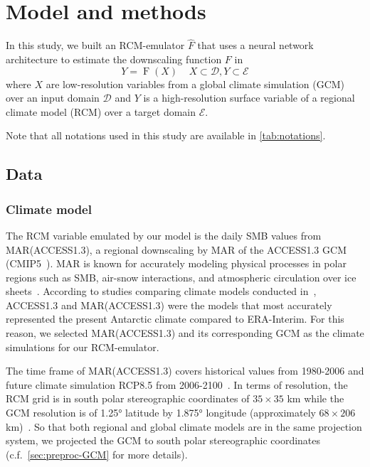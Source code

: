 \documentclass[a4paper,11pt,oneside]{report}
\begin{document}




\chapter{Model and methods}

In this study, we built an RCM-emulator $\hat{F}$ that uses a neural network architecture to estimate the downscaling function $F$ in 
\begin{equation}\label{eq:emulator-equation}
    Y = \operatorname{F}(X) \;\;\;\; X\subset\mathcal{D}, Y\subset\mathcal{E}
    \end{equation}
where $X$ are low-resolution variables from a global climate simulation (GCM) over an input domain $\mathcal{D}$ and $Y$ is a high-resolution surface variable of a regional climate model (RCM) over a target domain $\mathcal{E}$. 

Note that all notations used in this study are available in \autoref{tab:notations}. 


\section{Data}\label{sec:data}
\subsection{Climate model}
The RCM variable emulated by our model is the daily SMB values from MAR(ACCESS1.3), a regional downscaling by MAR of the ACCESS1.3 GCM (CMIP5~\cite{ACCESS13, CMIP5}). MAR is known for accurately modeling physical processes in polar regions such as SMB, air-snow interactions, and atmospheric circulation over ice sheets~\cite{MAR}. According to studies comparing climate models conducted in~\cite{Kittel, Agosta2015}, ACCESS1.3 and MAR(ACCESS1.3) were the models that most accurately represented the present Antarctic climate compared to ERA-Interim. For this reason, we selected MAR(ACCESS1.3) and its corresponding GCM as the climate simulations for our RCM-emulator. 

The time frame of MAR(ACCESS1.3) covers historical values from 1980-2006 and future climate simulation RCP8.5 from 2006-2100~\cite{Moss2010}. In terms of resolution, the RCM grid is in south polar stereographic coordinates of $35 \times 35$ \si{km} while the GCM resolution is of 1.25° latitude by 1.875° longitude (approximately $68 \times 206$ \si{km})~\cite{ACCESS13, ACCESS13_2}. So that both regional and global climate models are in the same projection system, we projected the GCM to south polar stereographic coordinates (c.f.~\autoref{sec:preproc-GCM} for more details). 
\end{document}

